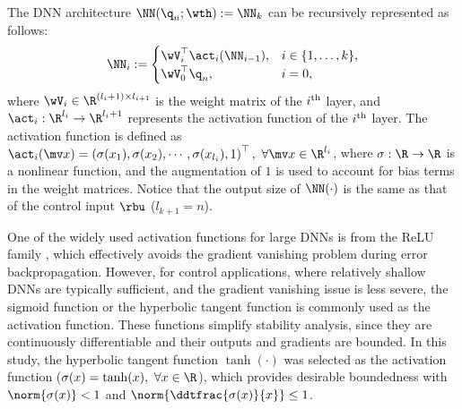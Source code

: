 \documentclass[lettersize,journal]{IEEEtran}
\begin{document}
The DNN architecture $\NN({\q}_n;\wth) := \NN_k$ can be recursively represented as follows:
\begin{equation}
    \NN_i :=
    \begin{cases}
        \wV_i^\top \act_i(\NN_{i-1}), 
        &
        i\in\{1,\dots ,k\},
        \\
        \wV_0^\top {\q}_n,
        &
        i=0
        ,
    \end{cases}
    \label{eq:DNN:architecture}
\end{equation}
where $\wV_i\in\R^{(l_i+1)\times l_{i+1}}$ is the weight matrix of the $i\textsuperscript{th}$ layer, and $\act_i: \R^{l_i}\to\R^{l_i+1}$ represents the activation function of the $i\textsuperscript{th}$ layer. 
The activation function is defined as $\act_i(\mv x)=\left(\sigma(x_1),\sigma(x_2),\cdots, \sigma(x_{l_{i}}), 1\right)^\top,\ \forall\mv x\in\R^{l_i}$, where $\sigma: \R\to\R$ is a nonlinear function, and the augmentation of $1$ is used to account for bias terms in the weight matrices. 
Notice that the output size of $\NN(\cdot)$ is the same as that of the control input $\rbu$ (\ie $l_{k+1}=n$). 


One of the widely used activation functions for large DNNs is from the ReLU family \cite{Maas:2013aa}, which effectively avoids the gradient vanishing problem during error backpropagation. 
However, for control applications, where relatively shallow DNNs are typically sufficient, and the gradient vanishing issue is less severe, the sigmoid function or the hyperbolic tangent function is commonly used as the activation function. 
These functions simplify stability analysis, since they are continuously differentiable and their outputs and gradients are bounded. 
In this study, the hyperbolic tangent function $\tanh(\cdot)$ was selected as the activation function (\ie $\sigma(x) = \tanh(x),\ \forall x\in\R$), which provides desirable boundedness with $\norm{\sigma(x)}<1$ and $\norm{\ddtfrac{\sigma(x)}{x}}\le 1$.
\end{document}

